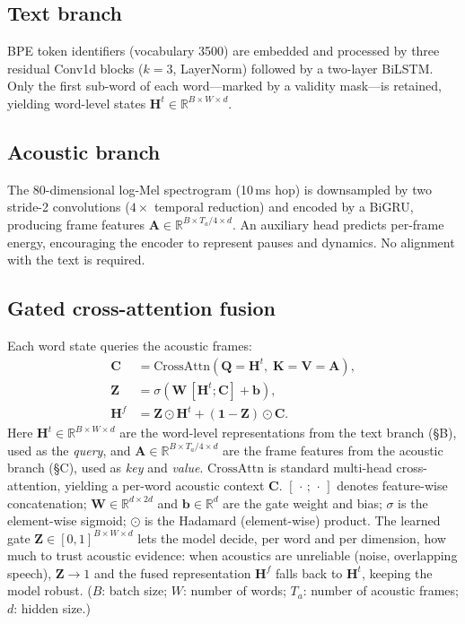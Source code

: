 \documentclass[conference]{IEEEtran}
\begin{document}
\subsection{Text branch}
BPE token identifiers (vocabulary 3500) are embedded and processed by three
residual \mbox{Conv1d} blocks ($k=3$, LayerNorm) followed by a two-layer BiLSTM.
Only the first sub-word of each word---marked by a validity mask---is retained,
yielding word-level states $\mathbf{H}^{t} \in \mathbb{R}^{B \times W \times d}$.

\subsection{Acoustic branch}
The 80-dimensional log-Mel spectrogram (10\,ms hop) is downsampled by two stride-2
convolutions ($4\times$ temporal reduction) and encoded by a BiGRU, producing frame
features $\mathbf{A} \in \mathbb{R}^{B \times T_a/4 \times d}$. An auxiliary head
predicts per-frame energy, encouraging the encoder to represent pauses and
dynamics. No alignment with the text is required.

\subsection{Gated cross-attention fusion}
Each word state queries the acoustic frames:
\begin{align}
\mathbf{C} &= \mathrm{CrossAttn}(\mathbf{Q}{=}\mathbf{H}^{t},\;
              \mathbf{K}{=}\mathbf{V}{=}\mathbf{A}), \\
\mathbf{Z} &= \sigma\!\left(\mathbf{W}\,[\mathbf{H}^{t};\mathbf{C}] + \mathbf{b}\right), \\
\mathbf{H}^{f} &= \mathbf{Z}\odot\mathbf{H}^{t} + (\mathbf{1}-\mathbf{Z})\odot\mathbf{C}.
\end{align}
Here $\mathbf{H}^{t}\!\in\!\mathbb{R}^{B\times W\times d}$ are the word-level
representations from the text branch (\S B), used as the \emph{query}, and
$\mathbf{A}\!\in\!\mathbb{R}^{B\times T_a/4\times d}$ are the frame features from
the acoustic branch (\S C), used as \emph{key} and \emph{value}.
$\mathrm{CrossAttn}$ is standard multi-head cross-attention, yielding a per-word
acoustic context $\mathbf{C}$. $[\,\cdot\,;\,\cdot\,]$ denotes feature-wise
concatenation; $\mathbf{W}\!\in\!\mathbb{R}^{d\times 2d}$ and
$\mathbf{b}\!\in\!\mathbb{R}^{d}$ are the gate weight and bias; $\sigma$ is the
element-wise sigmoid; $\odot$ is the Hadamard (element-wise) product. The learned
gate $\mathbf{Z}\!\in\![0,1]^{B\times W\times d}$ lets the model decide, per word
and per dimension, how much to trust acoustic evidence: when acoustics are
unreliable (noise, overlapping speech), $\mathbf{Z}\!\to\!1$ and the fused
representation $\mathbf{H}^{f}$ falls back to $\mathbf{H}^{t}$, keeping the model
robust. ($B$: batch size; $W$: number of words; $T_a$: number of acoustic frames;
$d$: hidden size.)
\end{document}

